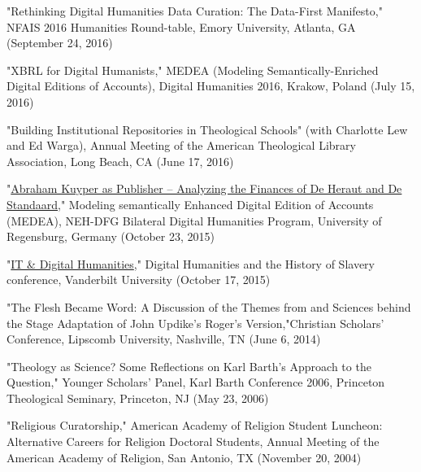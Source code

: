 \documentclass[10pt]{res} %
\begin{document}
\begin{resume}
\begin{hangparas}{.25in}{1}"Rethinking Digital Humanities Data Curation: The Data-First Manifesto," NFAIS 2016 Humanities Round-table, Emory University, Atlanta, GA (September 24, 2016)\end{hangparas}

\begin{hangparas}{.25in}{1}"XBRL for Digital Humanists," MEDEA (Modeling Semantically-Enriched Digital Editions of Accounts), Digital Humanities 2016, Krakow, Poland (July 15, 2016)\end{hangparas}

\begin{hangparas}{.25in}{1}"Building Institutional Repositories in Theological Schools" (with Charlotte Lew and Ed Warga), Annual Meeting of the American Theological Library Association, Long Beach, CA (June 17, 2016)\end{hangparas}

\begin{hangparas}{.25in}{1}"\href{http://medea.hypotheses.org/200}{Abraham Kuyper as Publisher – Analyzing the Finances of De Heraut and De Standaard}," Modeling semantically Enhanced Digital Edition of Accounts (MEDEA), NEH-DFG Bilateral Digital Humanities Program, University of Regensburg, Germany (October 23, 2015)\end{hangparas}

\begin{hangparas}{.25in}{1}"\href{https://my.vanderbilt.edu/digitalhumanities/files/2015/10/Digital-Humanities-and-the-History-of-Slavery-3.jpg}{IT \& Digital Humanities}," Digital Humanities and the History of Slavery conference, Vanderbilt University (October 17, 2015)\end{hangparas}

\begin{hangparas}{.25in}{1}"The Flesh Became Word: A Discussion of the Themes from and Sciences behind the Stage Adaptation of John Updike’s Roger’s Version,"Christian Scholars’ Conference, Lipscomb University, Nashville, TN (June 6, 2014)\end{hangparas}

\begin{hangparas}{.25in}{1}"Theology as Science? Some Reflections on Karl Barth’s Approach to the Question," Younger Scholars’ Panel, Karl Barth Conference 2006, Princeton Theological Seminary, Princeton, NJ (May 23, 2006)\end{hangparas}

\begin{hangparas}{.25in}{1}"Religious Curatorship," American Academy of Religion Student Luncheon: Alternative Careers for Religion Doctoral Students, Annual Meeting of the American Academy of Religion, San Antonio, TX (November 20, 2004)\end{hangparas}


\end{resume}
\end{document}
